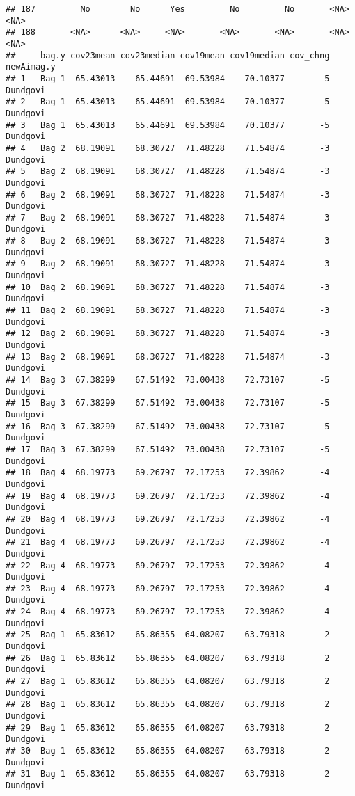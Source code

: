 \documentclass[
]{article}
\begin{document}
\begin{verbatim}
## 187         No        No      Yes         No         No       <NA>         <NA>
## 188       <NA>      <NA>     <NA>       <NA>       <NA>       <NA>         <NA>
##     bag.y cov23mean cov23median cov19mean cov19median cov_chng newAimag.y
## 1   Bag 1  65.43013    65.44691  69.53984    70.10377       -5   Dundgovi
## 2   Bag 1  65.43013    65.44691  69.53984    70.10377       -5   Dundgovi
## 3   Bag 1  65.43013    65.44691  69.53984    70.10377       -5   Dundgovi
## 4   Bag 2  68.19091    68.30727  71.48228    71.54874       -3   Dundgovi
## 5   Bag 2  68.19091    68.30727  71.48228    71.54874       -3   Dundgovi
## 6   Bag 2  68.19091    68.30727  71.48228    71.54874       -3   Dundgovi
## 7   Bag 2  68.19091    68.30727  71.48228    71.54874       -3   Dundgovi
## 8   Bag 2  68.19091    68.30727  71.48228    71.54874       -3   Dundgovi
## 9   Bag 2  68.19091    68.30727  71.48228    71.54874       -3   Dundgovi
## 10  Bag 2  68.19091    68.30727  71.48228    71.54874       -3   Dundgovi
## 11  Bag 2  68.19091    68.30727  71.48228    71.54874       -3   Dundgovi
## 12  Bag 2  68.19091    68.30727  71.48228    71.54874       -3   Dundgovi
## 13  Bag 2  68.19091    68.30727  71.48228    71.54874       -3   Dundgovi
## 14  Bag 3  67.38299    67.51492  73.00438    72.73107       -5   Dundgovi
## 15  Bag 3  67.38299    67.51492  73.00438    72.73107       -5   Dundgovi
## 16  Bag 3  67.38299    67.51492  73.00438    72.73107       -5   Dundgovi
## 17  Bag 3  67.38299    67.51492  73.00438    72.73107       -5   Dundgovi
## 18  Bag 4  68.19773    69.26797  72.17253    72.39862       -4   Dundgovi
## 19  Bag 4  68.19773    69.26797  72.17253    72.39862       -4   Dundgovi
## 20  Bag 4  68.19773    69.26797  72.17253    72.39862       -4   Dundgovi
## 21  Bag 4  68.19773    69.26797  72.17253    72.39862       -4   Dundgovi
## 22  Bag 4  68.19773    69.26797  72.17253    72.39862       -4   Dundgovi
## 23  Bag 4  68.19773    69.26797  72.17253    72.39862       -4   Dundgovi
## 24  Bag 4  68.19773    69.26797  72.17253    72.39862       -4   Dundgovi
## 25  Bag 1  65.83612    65.86355  64.08207    63.79318        2   Dundgovi
## 26  Bag 1  65.83612    65.86355  64.08207    63.79318        2   Dundgovi
## 27  Bag 1  65.83612    65.86355  64.08207    63.79318        2   Dundgovi
## 28  Bag 1  65.83612    65.86355  64.08207    63.79318        2   Dundgovi
## 29  Bag 1  65.83612    65.86355  64.08207    63.79318        2   Dundgovi
## 30  Bag 1  65.83612    65.86355  64.08207    63.79318        2   Dundgovi
## 31  Bag 1  65.83612    65.86355  64.08207    63.79318        2   Dundgovi

\end{verbatim}
\end{document}
